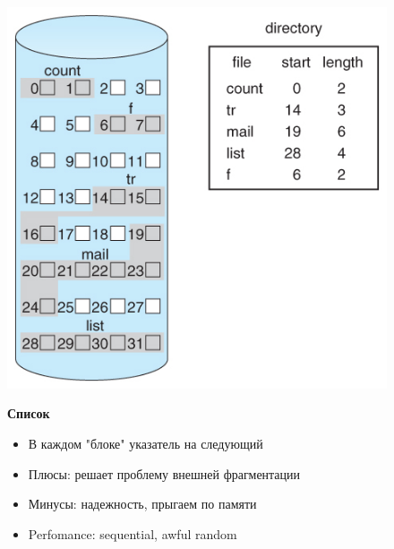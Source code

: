 \documentclass[../../lectures.tex]{subfiles}
\begin{document}
\begin{figure}[H]
\captionsetup{singlelinecheck=off}
\begin{minipage}[c]{0.5\linewidth}
\centering
\includegraphics[width=\textwidth]{images/contiguous-allocation.jpg}
\end{minipage}
\hspace{0.5cm}
\begin{minipage}[c]{0.5\linewidth}
\centering
\textbf{Список}
\begin{itemize}
    \item В каждом "блоке" указатель на следующий
    \item Плюсы: решает проблему внешней фрагментации
    \item Минусы: надежность, прыгаем по памяти
    \item Perfomance: sequential, awful random
\end{itemize}
\end{minipage}
\end{figure}
\end{document}
